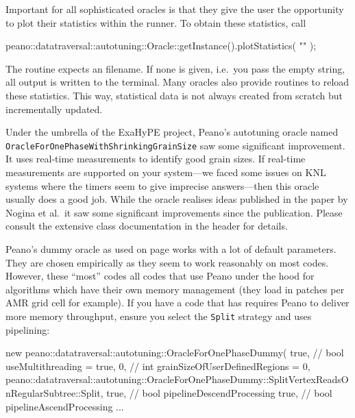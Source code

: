 Important for all sophisticated oracles is that they give the user the
opportunity to plot their statistics within the runner. 
To obtain these statistics, call
\begin{code}
  peano::datatraversal::autotuning::Oracle::getInstance().plotStatistics( "" );
\end{code}
The routine expects an filename.
If none is given, i.e.~you pass the empty string, all output is written to the
terminal.
Many oracles also provide routines to reload these statistics.
This way, statistical data is not always created from scratch but incrementally
updated.


\begin{remark}
 Under the umbrella of the ExaHyPE project, Peano's autotuning oracle named
 \texttt{OracleForOnePhaseWithShrinkingGrainSize} saw some significant
 improvement. It uses real-time measurements to identify good grain sizes. 
 If real-time measurements are supported on your system---we faced some issues
 on KNL systems where the timers seem to give imprecise answers---then this
 oracle usually does a good job. While the oracle realises ideas published in
 the paper by Nogina et al.~it saw some significant improvements since the
 publication. Please consult the extensive class documentation in the header for
 details.
\end{remark}


\noindent
Peano's dummy oracle as used on page \pageref{page:shared_memory:dummy-oracle}
works with a lot of default parameters.
They are chosen empirically as they seem to work reasonably on most codes.
However, these ``most'' codes all codes that use Peano under
the hood for algorithms which have their own memory management (they load in
patches per AMR grid cell for example).
If you have a code that has requires Peano to deliver more memory throughput,
ensure you select the \texttt{Split} strategy and uses pipelining: 

\begin{code}
new peano::datatraversal::autotuning::OracleForOnePhaseDummy(
 true,  //   bool useMultithreading                  = true,
 0,     //   int  grainSizeOfUserDefinedRegions      = 0,
 peano::datatraversal::autotuning::OracleForOnePhaseDummy::SplitVertexReadsOnRegularSubtree::Split,
 true, //  bool pipelineDescendProcessing
 true, //   bool pipelineAscendProcessing
 ...
\end{code}





